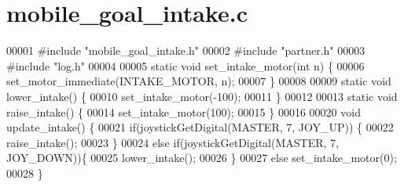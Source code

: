 \section{mobile\+\_\+goal\+\_\+intake.\+c}
\label{mobile__goal__intake_8c_source}

\begin{DoxyCode}
00001 \textcolor{preprocessor}{#include "mobile_goal_intake.h"}
00002 \textcolor{preprocessor}{#include "partner.h"}
00003 \textcolor{preprocessor}{#include "log.h"}
00004 
00005 \textcolor{keyword}{static} \textcolor{keywordtype}{void} set_intake_motor(\textcolor{keywordtype}{int} n) \{
00006   set_motor_immediate(INTAKE_MOTOR, n);
00007 \}
00008 
00009 \textcolor{keyword}{static} \textcolor{keywordtype}{void} lower_intake() \{
00010   set_intake_motor(-100);
00011 \}
00012 
00013 \textcolor{keyword}{static} \textcolor{keywordtype}{void} raise_intake() \{
00014   set_intake_motor(100);
00015 \}
00016 
00020 \textcolor{keywordtype}{void} update_intake() \{
00021   \textcolor{keywordflow}{if}(joystickGetDigital(MASTER, 7, JOY\_UP)) \{
00022     raise_intake();
00023   \}
00024   \textcolor{keywordflow}{else} \textcolor{keywordflow}{if}(joystickGetDigital(MASTER, 7, JOY\_DOWN))\{
00025     lower_intake();
00026   \}
00027   \textcolor{keywordflow}{else} set_intake_motor(0);
00028 \}
\end{DoxyCode}
